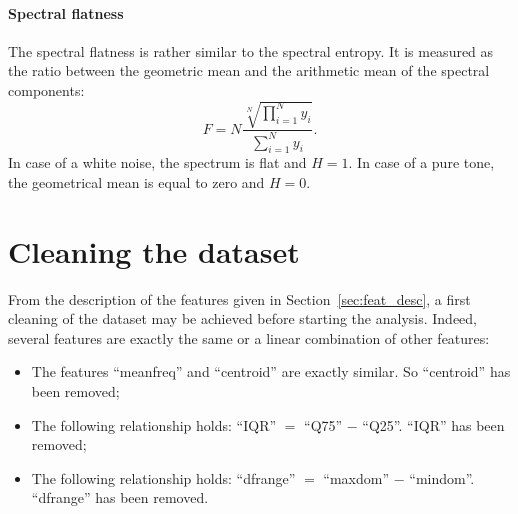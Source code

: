 \paragraph{Spectral flatness}
The spectral flatness is rather similar to the spectral entropy. It is measured as the ratio between the geometric mean and the arithmetic mean of the spectral components:
\begin{equation}
\label{eq:spec_flat}
	F = N \frac{\sqrt[N]{\prod\limits_{i=1}^{N} y_i}}{\sum \limits_{i=1}^{N} y_i}.
\end{equation}
In case of a white noise, the spectrum is flat and $H=1$. In case of a pure tone, the geometrical mean is equal to zero and $H=0$.

\section{Cleaning the dataset}
\label{sec_cleaning_dataset}
From the description of the features given in Section~\ref{sec:feat_desc}, a first cleaning of the dataset may be achieved before starting the analysis.
Indeed, several features are exactly the same or a linear combination of other features:
\begin{itemize}
	\item The features ``meanfreq'' and ``centroid'' are exactly similar. So ``centroid'' has been removed;
	\item The following relationship holds:  ``IQR'' $=$ ``Q75'' $-$ ``Q25''. ``IQR'' has been removed;
	\item The following relationship holds:  ``dfrange'' $=$ ``maxdom'' $-$ ``mindom''. ``dfrange'' has been removed.
\end{itemize}
